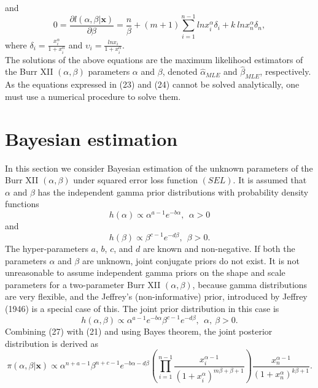 \documentclass[a4paper, 11pt]{article}
\numberwithin{equation}{section}
\begin{document}
and
\begin{equation}
0=\frac{\partial l(\alpha, \beta|\mathbf{x})}{\partial \beta}=\frac{n}{\beta}+(m+1)\sum_{i=1}^{n-1}ln x_{i}^{\alpha}\delta_{i}+k~ln x_{n}^{\alpha}\delta_{n},
\label{beta_mle}
\end{equation}
where
$\delta_{i}=\frac{x_{i}^{\alpha}}{1+x_{i}^{\alpha}}$ and $\upsilon_{i}=\frac{ln x_{i}}{1+x_{i}^{\alpha}}$.\\The solutions of the above equations are the maximum likelihood estimators of the Burr XII $(\alpha, \beta)$ parameters $\alpha$  and $\beta$, denoted  $\hat{\alpha}_{MLE}$  and $\hat{\beta}_{MLE}$, respectively. As the equations expressed in (23) and (24) cannot be solved analytically, one must use a numerical procedure to solve them.

\section{Bayesian  estimation}
In this section we consider Bayesian estimation of the unknown parameters of the Burr XII $(\alpha, \beta)$ under squared error loss function $(SEL)$. It is assumed that  $\alpha$  and $\beta$   has the independent gamma prior distributions with probability density functions
\begin{equation}
h(\alpha)\propto \alpha^{a-1}e^{-b\alpha},~~\alpha>0
\end{equation}
and
\begin{equation}
h(\beta)\propto \beta^{c-1}e^{-d\beta},~~\beta>0.
\end{equation}
The hyper-parameters $a$, $b$, $c$, and $d$ are known and non-negative. If both the parameters $\alpha$  and $\beta$  are unknown, joint conjugate priors do not exist. It is not unreasonable to assume independent gamma priors on the shape and scale parameters for a two-parameter  Burr XII $(\alpha, \beta)$, because gamma distributions are very flexible, and the Jeffrey's (non-informative) prior, introduced by Jeffrey (1946) is a special case of this. The joint prior distribution in this case is
\begin{equation}
h(\alpha, \beta)\propto \alpha^{a-1} e^{-b\alpha} \beta^{c-1} e^{-d\beta},~~\alpha,~\beta>0.
\end{equation}
Combining (27) with  (21) and using Bayes theorem, the joint posterior distribution is derived as
\begin{equation}
\pi(\alpha, \beta|\mathbf{x})\propto\alpha^{n+a-1} \beta^{n+c-1}e^{-b\alpha-d\beta}\left(\prod_{i=1}^{n-1}\frac{x_{i}^{\alpha-1}}{(1+x_{i}^{\alpha})^{m\beta+\beta+1}}\right)\frac{x_{n}^{\alpha-1}}{(1+x_{n}^{\alpha})^{k\beta+1}}.
\label{joint_post}
\end{equation}
\end{document}
